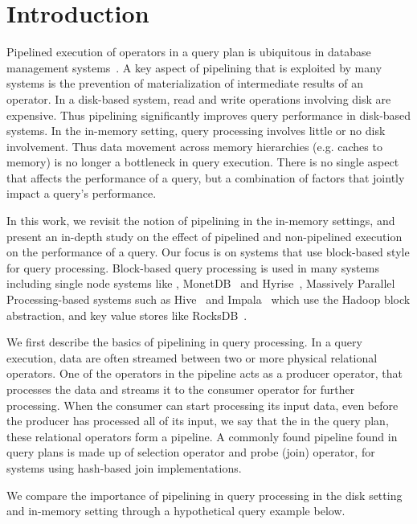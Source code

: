 \section{Introduction}

Pipelined execution of operators in a query plan is ubiquitous in database management systems~\cite{quickstep-system, monetdb, hyper, vectorwise, elastic-pipelining}. 
A key aspect of pipelining that is exploited by many systems is the prevention of materialization of intermediate results of an operator.  
In a disk-based system, read and write operations involving disk are expensive.
Thus pipelining significantly improves query performance in disk-based systems. 
In the in-memory setting, query processing involves little or no disk involvement. 
Thus data movement across memory hierarchies (e.g. caches to memory) is no longer a bottleneck in query execution.
There is no single aspect that affects the performance of a query, but a combination of factors that jointly impact a query's performance. 

In this work, we revisit the notion of pipelining in the in-memory settings, and present an in-depth study on the effect of pipelined and non-pipelined execution on the performance of a query. 
Our focus is on systems that use block-based style for query processing.
Block-based query processing is used in many systems including single node systems like \sys{}, MonetDB~\cite{monetdb} and Hyrise~\cite{hyrise-website}, Massively Parallel Processing-based systems such as Hive~\cite{hive} and Impala~\cite{impala} which use the Hadoop block abstraction, and key value stores like RocksDB~\cite{rocksdb}.

We first describe the basics of pipelining in query processing. 
In a query execution, data are often streamed between two or more physical relational operators. 
One of the operators in the pipeline acts as a producer operator, that processes the data and streams it to the consumer operator for further processing. 
When the consumer can start processing its input data, even before the producer has processed all of its input, we say that the in the query plan, these relational operators form a pipeline.
A commonly found pipeline found in query plans is made up of selection operator and probe (join) operator, for systems using hash-based join implementations.

We compare the importance of pipelining in query processing in the disk setting and in-memory setting through a hypothetical query example below.

